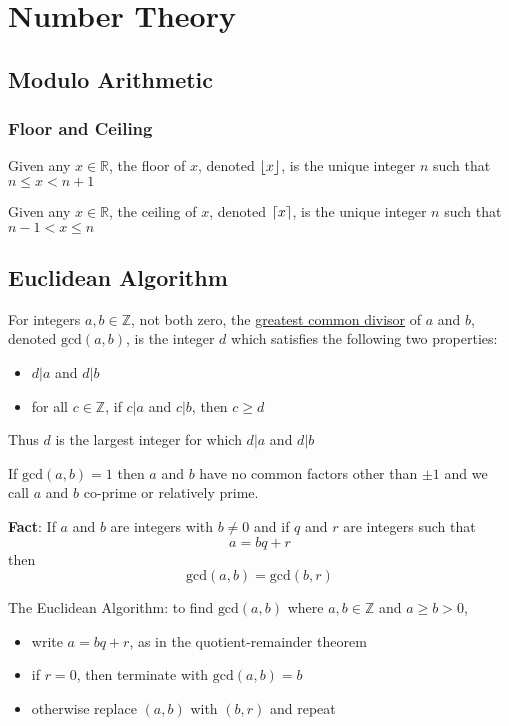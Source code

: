 \section{Number Theory}
\subsection{Modulo Arithmetic}
\subsubsection{Floor and Ceiling}
\begin{definition}
	Given any $x\in\mathbb R$, the floor of $x$, denoted $\lfloor x\rfloor$, is the unique integer $n$ such that $n \leq x < n + 1$

	Given any $x\in\mathbb R$, the ceiling of $x$, denoted $\lceil x\rceil$, is the unique integer $n$ such that $n-1 < x \leq n$
\end{definition}

\subsection{Euclidean Algorithm}
\begin{definition}
    For integers $a,b\in\mathbb Z$, not both zero, the \underline{greatest common divisor} of $a$ and $b$, denoted $\text{gcd}\left(a,b\right)$, is the integer $d$ which satisfies the following two properties:
    \begin{itemize}
        \item $d|a$ and $d|b$
        \item for all $c\in\mathbb Z$, if $c|a$ and $c|b$, then $c\geq d$
    \end{itemize}
    Thus $d$ is the largest integer for which $d|a$ and $d|b$
\end{definition}

If $\text{gcd}\left(a,b\right) = 1$ then $a$ and $b$ have no common factors other than $\pm 1$ and we call $a$ and $b$ co-prime or relatively prime.

\textbf{Fact}: If $a$ and $b$ are integers with $b\neq 0$ and if $q$ and $r$ are integers such that $$a = bq + r$$ then $$\text{gcd}\left(a,b\right) = \text{gcd}\left(b,r\right)$$

\begin{definition}
    The Euclidean Algorithm: to find $\text{gcd}\left(a,b\right)$ where $a,b\in\mathbb Z$ and $a\geq b>0$,
    \begin{itemize}
        \item write $a=bq+r$, as in the quotient-remainder theorem
        \item if $r=0$, then terminate with $\text{gcd}\left(a,b\right)=b$
        \item otherwise replace $\left(a,b\right)$ with $\left(b,r\right)$ and repeat
    \end{itemize}
\end{definition}

